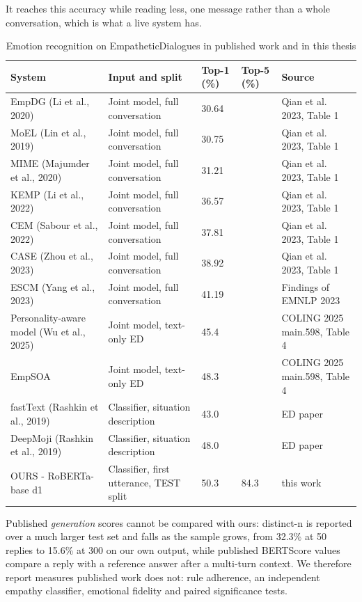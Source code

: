 It reaches this accuracy while reading less, one message rather than a whole conversation, which is what a live system has.

\begin{table}[htbp]
\centering
\scriptsize
\begin{tabularx}{\textwidth}{@{}lXXXX@{}}
\toprule
\textbf{System} & \textbf{Input and split} & \textbf{Top-1 (\%)} & \textbf{Top-5 (\%)} & \textbf{Source} \\
\midrule
EmpDG (Li et al., 2020) & Joint model, full conversation & 30.64 &  & Qian et al. 2023, Table 1 \\
MoEL (Lin et al., 2019) & Joint model, full conversation & 30.75 &  & Qian et al. 2023, Table 1 \\
MIME (Majumder et al., 2020) & Joint model, full conversation & 31.21 &  & Qian et al. 2023, Table 1 \\
KEMP (Li et al., 2022) & Joint model, full conversation & 36.57 &  & Qian et al. 2023, Table 1 \\
CEM (Sabour et al., 2022) & Joint model, full conversation & 37.81 &  & Qian et al. 2023, Table 1 \\
CASE (Zhou et al., 2023) & Joint model, full conversation & 38.92 &  & Qian et al. 2023, Table 1 \\
ESCM (Yang et al., 2023) & Joint model, full conversation & 41.19 &  & Findings of EMNLP 2023 \\
Personality-aware model (Wu et al., 2025) & Joint model, text-only ED & 45.4 &  & COLING 2025 main.598, Table 4 \\
EmpSOA & Joint model, text-only ED & 48.3 &  & COLING 2025 main.598, Table 4 \\
fastText (Rashkin et al., 2019) & Classifier, situation description & 43.0 &  & ED paper \\
DeepMoji (Rashkin et al., 2019) & Classifier, situation description & 48.0 &  & ED paper \\
OURS - RoBERTa-base d1 & Classifier, first utterance, TEST split & 50.3 & 84.3 & this work \\
\bottomrule
\end{tabularx}
\caption{Emotion recognition on EmpatheticDialogues in published work and in this thesis}
\label{tab:5.5}
\end{table}

Published \textit{generation} scores cannot be compared with ours: distinct-n is reported over a much larger test set and falls as the sample grows, from 32.3\% at 50 replies to 15.6\% at 300 on our own output, while published BERTScore values compare a reply with a reference answer after a multi-turn context. We therefore report measures published work does not: rule adherence, an independent empathy classifier, emotional fidelity and paired significance tests.

